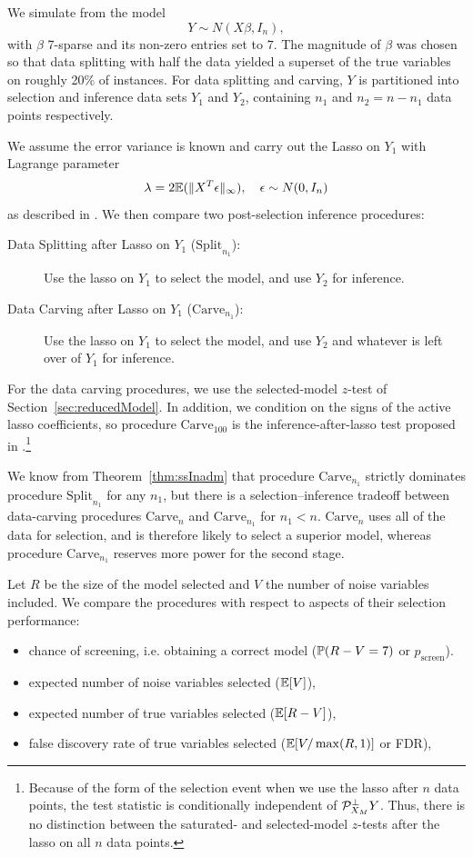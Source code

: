 \documentclass{article}
\theoremstyle{definition}
\newcommand{\bX}{X}
\newcommand{\proj}{\cP}
\newcommand{\sampOrData}{data }
\newcommand{\capSampOrData}{Data }
\begin{document}
We simulate from the model
\begin{equation}
  Y \sim N(\bX \beta, I_n),
\end{equation}
with $\beta$ 7-sparse and its non-zero entries set to $7$. The magnitude of $\beta$ was chosen so that
\sampOrData splitting with half the data yielded a superset of the true variables on roughly 20\% of instances.
For \sampOrData splitting and carving,  $Y$ is partitioned into selection and inference data sets $Y_{1}$ and $Y_{2}$, containing $n_1$ and $n_2=n-n_1$ data points respectively.

We assume the error variance is known and carry out the Lasso on $Y_1$ with Lagrange parameter
$$\lambda=2\E(\|X^T\epsilon\|_{\infty}), \quad \epsilon \sim N(0, I_n)$$ as described in \citep{negahban_unified}. We then compare two post-selection inference procedures:
\begin{description}
\item[\capSampOrData Splitting after Lasso on $Y_{1}$ ($\text{Split}_{n_1}$):] Use the lasso on $Y_{1}$ to select the model, and use $Y_{2}$ for inference.
\item[\capSampOrData Carving after Lasso on $Y_{1}$ ($\text{Carve}_{n_1}$):] Use the lasso on $Y_{1}$ to select the model, and use $Y_{2}$ and whatever is left over of $Y_{1}$ for inference.
\end{description}
For the \sampOrData carving procedures, we use the selected-model $z$-test of Section~\ref{sec:reducedModel}.
In addition, we condition on the signs of the active lasso coefficients, so procedure $\text{Carve}_{100}$ is the inference-after-lasso test proposed in \citet{lee2016exact}.\footnote{Because of the form of the selection event when we use the lasso after $n$ data points, the test statistic is conditionally independent of $\proj_{\bX_{M}}^\perp Y$. Thus, there is no distinction between the saturated- and selected-model $z$-tests after the lasso on all $n$ data points.}

We know from Theorem~\ref{thm:ssInadm} that procedure $\text{Carve}_{n_1}$ strictly dominates procedure $\text{Split}_{n_1}$ for any $n_1$, but there is a selection--inference tradeoff between data-carving procedures $\text{Carve}_n$ and $\text{Carve}_{n_1}$ for $n_1<n$. $\text{Carve}_{n}$ uses all of the data for selection, and is therefore likely to select a superior model, whereas procedure $\text{Carve}_{n_1}$ reserves more power for the second stage.

Let $R$ be the size of the model selected and $V$ the number of noise variables included. We compare the procedures with respect to aspects of their selection performance:
\begin{itemize}
  \item chance of screening, i.e. obtaining a correct model ($\P(R-V=7)$ or $p_{\text{screen}}$).
  \item expected number of noise variables selected ($\E[V]$),
  \item expected number of true variables selected ($\E[R-V]$),
  \item false discovery rate of true variables selected
    ($\E[V/\max(R, 1)]$ or FDR),
\end{itemize}
\end{document}
